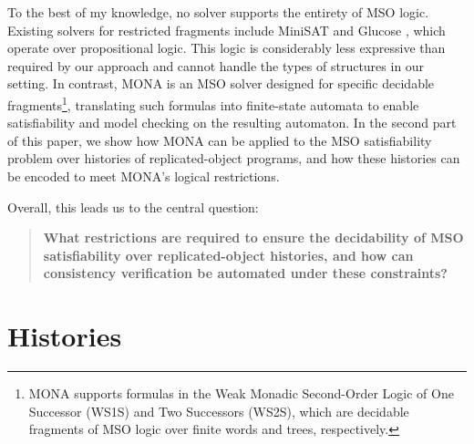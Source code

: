 \documentclass[12pt]{article}
\begin{document}
To the best of my knowledge, no solver supports the entirety of MSO logic. Existing solvers for restricted fragments include MiniSAT \cite{MiniSAT} and Glucose \cite{Glucose}, which operate over propositional logic. This logic is considerably less expressive than required by our approach and cannot handle the types of structures in our setting. In contrast, MONA\cite{MONA} is an MSO solver designed for specific decidable fragments\footnote{MONA supports formulas in the Weak Monadic Second-Order Logic of One Successor (WS1S) and Two Successors (WS2S), which are decidable fragments of MSO logic over finite words and trees, respectively.}, translating such formulas into finite-state automata to enable satisfiability and model checking on the resulting automaton. In the second part of this paper, we show how MONA can be applied to the MSO satisfiability problem over histories of replicated-object programs, and how these histories can be encoded to meet MONA's logical restrictions.

Overall, this leads us to the central question:

\begin{quote}
\textbf{What restrictions are required to ensure the decidability of MSO satisfiability
 over replicated-object histories, and how can consistency verification be automated under these constraints?}
\end{quote}

%


\section{Histories}
\label{sec:definitions}

\end{document}
